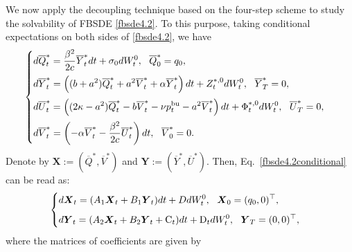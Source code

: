\documentclass[11pt]{article}
\numberwithin{equation}{section}
\begin{document}
We now apply the decoupling technique based on the four-step scheme to study the solvability of FBSDE \eqref{fbsde4.2}. To this purpose, taking conditional expectations on both sides of \eqref{fbsde4.2}, we have
    \begin{align}\label{fbsde4.2conditional}
    	\begin{cases}
    		\displaystyle d\overline{Q}_t^*=\frac{\beta^2}{2c}\overline{Y}_t^*dt+\sigma_0dW_t^0, ~~ \overline{Q}_0^*=q_0,\\[0.8em]
    		\displaystyle d\overline{Y}_t^*=\left((b+a^2)\overline{Q}_t^*+a^2\overline{V}_t^*+\alpha \overline{Y}_t^*\right)dt+Z_t^{*,0}dW_t^0,~~ \overline{Y}_T^*=0,\\[0.8em]
    		\displaystyle d\overline{U}_t^*=\left((2\kappa-a^2) \overline{Q}_t^*-b\overline{V}_t^*-\nu p_t^{{\rm bu}}-a^2\overline{V}_t^*\right)dt+\Phi_t^{*, 0}dW_t^0,~~ \overline{U}_T^*=0,\\[0.8em]
    		\displaystyle d\overline{V}_t^*=\left(-\alpha \overline{V}_t^*-\frac{\beta^2}{2c}\overline{U}_t^*\right)dt,~~ \overline{V}_0^*=0.
    	\end{cases}
    \end{align}
Denote by $\boldsymbol{X}:=(\overline{Q}^*, \overline{V}^*)$ and $\boldsymbol{Y}:=(\overline{Y}^*, \overline{U}^*)$. Then, Eq.~\eqref{fbsde4.2conditional} can be read as: 
    \begin{align}\label{overlinex}
    	\begin{cases}
    		\displaystyle d\boldsymbol{X}_t=(A_1\boldsymbol{X}_t+B_1 \boldsymbol{Y}_t)dt+DdW_t^0,~~ \boldsymbol{X}_0=(q_0,0)^{\top},\\[0.6em]
    		\displaystyle d\boldsymbol{Y}_t=(A_2 \boldsymbol{X}_t+B_2\boldsymbol{Y}_t+{\rm C}_t)dt+{\rm D}_tdW_t^0,~~\boldsymbol{Y}_T=(0,0)^{\top},
    	\end{cases}	
    \end{align}
    where the matrices of coefficients are given by
\end{document}
